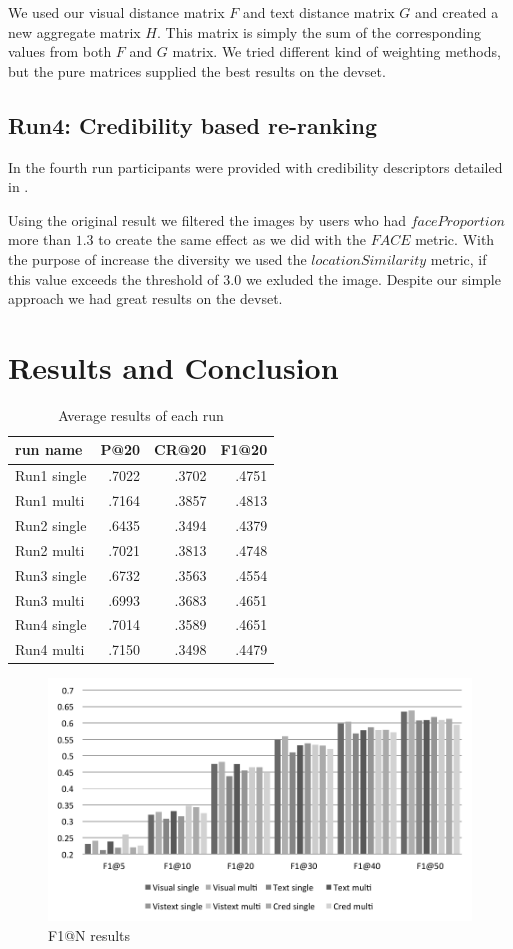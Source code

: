 \documentclass{sig-alternate}
\begin{document}
We used our visual distance matrix $F$ and text distance matrix $G$ and created a new aggregate matrix $H$. This matrix is simply the sum of the corresponding values from both $F$ and $G$ matrix. We tried different kind of weighting methods, but the pure matrices supplied the best results on the devset.

\subsection{Run4: Credibility based re-ranking}
In the fourth run participants were provided with credibility descriptors detailed in \cite{Task2015}.

Using the original result we filtered the images by users who had $faceProportion$ more than $1.3$ to create the same effect as we did with the $FACE$ metric. With the purpose of increase the diversity we used the $locationSimilarity$ metric, if this value exceeds the threshold of $3.0$ we exluded the image. Despite our simple approach we had great results on the devset.

\section{Results and Conclusion}

\begin{table}[h]
	\centering
\begin{tabular}{|l|r|r|r|}
	\hline 
	run name & P@20 & CR@20 & F1@20\tabularnewline
	\hline 
	\hline 
	Run1 single & .7022 & .3702 & .4751\tabularnewline
	\hline 
	Run1 multi & .7164 & .3857 & .4813\tabularnewline
	\hline 
	Run2 single & .6435 & .3494 & .4379\tabularnewline
	\hline 
	Run2 multi & .7021 & .3813 & .4748\tabularnewline
	\hline 
	Run3 single & .6732 & .3563 & .4554\tabularnewline
	\hline 
	Run3 multi & .6993 & .3683 & .4651\tabularnewline
	\hline 
	Run4 single & .7014 & .3589 & .4651\tabularnewline
	\hline 
	Run4 multi & .7150 & .3498 & .4479\tabularnewline
	\hline
\end{tabular}
\label{table:results}
\caption{Average results of each run}
\end{table}

\begin{figure}[h]
\includegraphics[width=1.0\linewidth]{f1}
\caption{F1@N results}
\label{fig:f1}
\end{figure}
\end{document}
